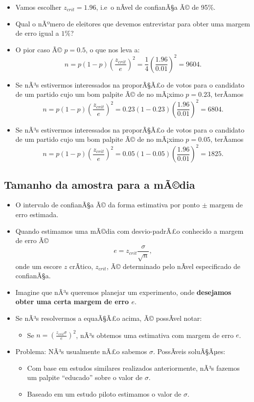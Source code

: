 \documentclass[]{article}
\providecommand{\tightlist}{%
  \setlength{\itemsep}{0pt}\setlength{\parskip}{0pt}}
\begin{document}
\begin{itemize}
\tightlist
\item
  Vamos escolher \(z_{crit}=1.96\), i.e~o nÃ­vel de confianÃ§a Ã© de
  95\%.
\item
  Qual o nÃºmero de eleitores que devemos entrevistar para obter uma
  margem de erro igual a \(1\%\)?
\item
  O pior caso Ã© \(p=0.5\), o que nos leva a: \[
    n=p(1-p)\left(\frac{z_{crit}}{e}\right)^2=\frac{1}{4}\left(\frac{1.96}{0.01}\right)^2 = 9604.
    \]
\item
  Se nÃ³s estivermos interessados na proporÃ§Ã£o de votos para o
  candidato de um partido cujo um bom palpite Ã© de no mÃ¡ximo
  \(p=0.23\), terÃ­amos \[
    n=p(1-p)\left(\frac{z_{crit}}{e}\right)^2=0.23(1-0.23)\left(\frac{1.96}{0.01}\right)^2 = 6804.
    \]
\item
  Se nÃ³s estivermos interessados na proporÃ§Ã£o de votos para o
  candidato de um partido cujo um bom palpite Ã© de no mÃ¡ximo
  \(p=0.05\), terÃ­amos \[ 
    n=p(1-p)\left(\frac{z_{crit}}{e}\right)^2 = 0.05(1-0.05)\left(\frac{1.96}{0.01}\right)^2 = 1825.
    \]
\end{itemize}

\subsection{Tamanho da amostra para a
mÃ©dia}\label{tamanho-da-amostra-para-a-madia}

\begin{itemize}
\tightlist
\item
  O intervalo de confianÃ§a Ã© da forma estimativa por ponto \(\pm\)
  margem de erro estimada.
\item
  Quando estimamos uma mÃ©dia com desvio-padrÃ£o conhecido a margem de
  erro Ã© \[
    e=z_{crit}\frac{\sigma}{\sqrt{n}},
    \] onde um escore \(z\) crÃ­tico, \(z_{crit}\), Ã© determinado pelo
  nÃ­vel especificado de confianÃ§a.
\item
  Imagine que nÃ³s queremos planejar um experimento, onde
  \textbf{desejamos obter uma certa margem de erro \(e\)}.
\item
  Se nÃ³s resolvermos a equaÃ§Ã£o acima, Ã© possÃ­vel notar:

  \begin{itemize}
  \tightlist
  \item
    Se \(n=(\frac{z_{crit}\sigma}{e})^2\), nÃ³s obtemos uma estimativa
    com margem de erro \(e\).
  \end{itemize}
\item
  Problema: NÃ³s usualmente nÃ£o sabemos \(\sigma\). PossÃ­veis
  soluÃ§Ãµes:

  \begin{itemize}
  \tightlist
  \item
    Com base em estudos similares realizados anteriormente, nÃ³s fazemos
    um palpite ``educado'' sobre o valor de \(\sigma\).
  \item
    Baseado em um estudo piloto estimamos o valor de \(\sigma\).
  \end{itemize}
\end{itemize}
\end{document}
